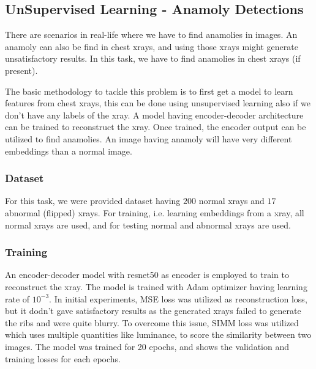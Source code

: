 \subsection{UnSupervised Learning - Anamoly Detections}
\label{sec:warmup8}

    There are scenarios in real-life where we have to find anamolies in images. An anamoly can also be find in chest xrays, and using those xrays might generate unsatisfactory results. In this task, we have to find anamolies in chest xrays (if present).

    The basic methodology to tackle this problem is to first get a model to learn features from chest xrays, this can be done using unsupervised learning also if we don't have any labels of the xray. A model having encoder-decoder architecture can be trained to reconstruct the xray. Once trained, the encoder output can be utilized to find anamolies. An image having anamoly will have very different embeddings than a normal image.

\subsubsection{Dataset}
\label{sec:unsupervised-dataset}
  For this task, we were provided dataset having $200$ normal xrays and $17$ abnormal (flipped) xrays. For training, i.e. learning embeddings from a xray, all normal xrays are used, and for testing normal and abnormal xrays are used.

\subsubsection{Training}
 
    An encoder-decoder model with resnet50 as encoder is employed to train to reconstruct the xray. The model is trained with Adam optimizer having learning rate of $10^{-3}$. In initial experiments, MSE loss was utilized as reconstruction loss, but it dodn't gave satisfactory results as the generated xrays failed to generate the ribs and were quite blurry. To overcome this issue, SIMM loss was utilized which uses multiple quantities like luminance, to score the similarity between two images. The model was trained for 20 epochs, and  shows the validation and training losses for each epochs. 

